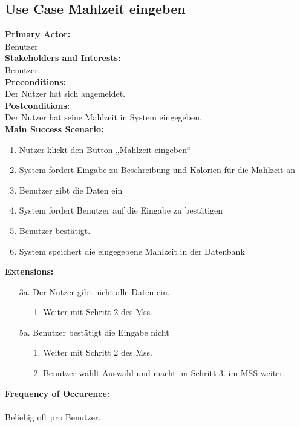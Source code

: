 \documentclass[12pt,a4paper,onecolumn]{article}
\begin{document}
\subsection{Use Case Mahlzeit eingeben}
\textbf{Primary Actor:}\\ Benutzer\\
\textbf{Stakeholders and Interests:}\\
Benutzer.\\
\textbf{Preconditions:} \\ Der Nutzer hat sich angemeldet.\\
\textbf{Postconditions:}\\Der Nutzer hat seine Mahlzeit in System eingegeben.\\
\textbf{Main Success Scenario:}
\begin{enumerate}
    \item Nutzer klickt den Button „Mahlzeit eingeben“
    \item System fordert Eingabe zu Beschreibung und Kalorien für die Mahlzeit an
    \item Benutzer gibt die Daten ein
    \item System fordert Benutzer auf die Eingabe zu bestätigen
    \item Benutzer bestätigt.
    \item System speichert die eingegebene Mahlzeit in der Datenbank
\end{enumerate}
\textbf{Extensions:}
\begin{enumerate}
    \item [3a.]  Der Nutzer gibt nicht alle Daten ein.
    \begin{enumerate}
        \item[1.]Weiter mit Schritt 2 des Mss.
    \end{enumerate}
    \item [5a.]  Benutzer bestätigt die Eingabe nicht\\
    \begin{enumerate}
        \item[1.]Weiter mit Schritt 2 des Mss.
        \item[2.]Benutzer wählt Auswahl und macht im Schritt 3. im MSS weiter.
    \end{enumerate}
\end{enumerate}
\textbf{Frequency of Occurence:}\\ \\
Beliebig oft pro Benutzer. 
\end{document}
